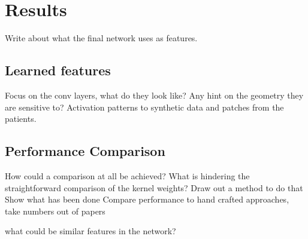 \documentclass[main.tex]{subfiles}
\begin{document}
\chapter{Results}\label{chap:04results}
Write about what the final network uses as features.
\section{Learned features}
Focus on the conv layers, what do they look like? Any hint on the geometry they are sensitive to?
Activation patterns to synthetic data and patches from the patients.

\section{Performance Comparison}
How could a comparison at all be achieved? What is hindering the straightforward comparison of the kernel weights? Draw out a method to do that
Show what has been done
Compare performance to hand crafted approaches, 
take numbers out of papers

what could be similar features in the network?
\end{document}
